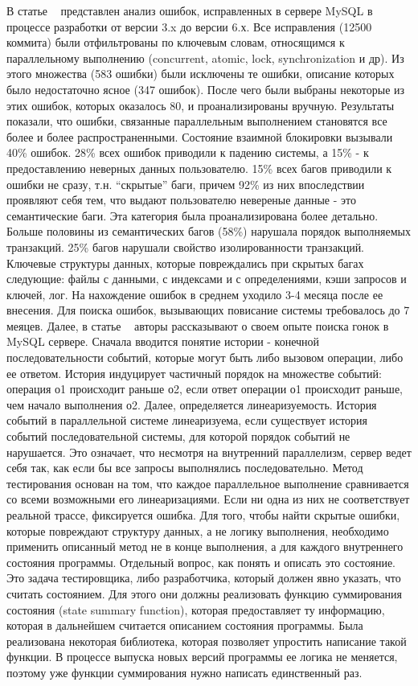 В статье ~\cite{Fonseca:2010} представлен анализ ошибок, исправленных в сервере MySQL в процессе разработки от версии 3.x до версии 6.х. Все исправления (12500 коммита) были отфильтрованы по ключевым словам, относящимся к параллельному выполнению (concurrent, atomic, lock, synchronization и др). Из этого множества (583 ошибки) были исключены те ошибки, описание которых было недостаточно ясное (347 ошибок). После чего были выбраны некоторые из этих ошибок, которых оказалось 80, и проанализированы вручную.  
Результаты показали, что ошибки, связанные параллельным выполнением становятся все более и более распространенными. Состояние взаимной блокировки вызывали 40\% ошибок. 28\% всех ошибок приводили к падению системы, а 15\% - к предоставлению неверных данных пользователю. 15\% всех багов приводили к ошибки не сразу, т.н. “скрытые” баги, причем 92\% из них впоследствии проявляют себя тем, что выдают пользователю невереные данные - это семантические баги. Эта категория была проанализирована более детально. Больше половины из семантических багов (58\%) нарушала порядок выполняемых транзакций. 25\% багов нарушали свойство изолированности транзакций. Ключевые структуры данных, которые повреждались при скрытых багах следующие: файлы с данными, с индексами и с определениями, кэши запросов и ключей, лог. 
На нахождение ошибок в среднем уходило 3-4 месяца после ее внесения. Для поиска ошибок, вызывающих повисание системы требовалось до 7 меяцев.
Далее, в статье ~\cite{Fonseca:2011} авторы рассказывают о своем опыте поиска гонок в MySQL сервере.
Сначала вводится понятие истории - конечной последовательности событий, которые могут быть либо вызовом операции, либо ее ответом. История индуцирует частичный порядок на множестве событий: операция о1 происходит раньше о2, если ответ операции о1 происходит раньше, чем начало выполнения о2. Далее, определяется линеаризуемость. История событий в параллельной системе линеаризуема, если существует история событий последовательной системы, для которой порядок событий не нарушается. Это означает, что несмотря на внутренний параллелизм, сервер ведет себя так, как если бы все запросы выполнялись последовательно. 
Метод тестирования основан на том, что каждое параллельное выполнение сравнивается со всеми возможными его линеаризациями. Если ни одна из них не соответствует реальной трассе, фиксируется ошибка. 
Для того, чтобы найти скрытые ошибки, которые повреждают структуру данных, а не логику выполнения, необходимо применить описанный метод не в конце выполнения, а для каждого внутреннего состояния программы. Отдельный вопрос, как понять и описать это состояние. Это задача тестировщика, либо разработчика, который должен явно указать, что считать состоянием. Для этого они должны реализовать функцию суммирования состояния (state summary function), которая предоставляет ту информацию, которая в дальнейшем считается описанием состояния программы. Была реализована некоторая библиотека, которая позволяет упростить написание такой функции. В процессе выпуска новых версий программы ее логика не меняется, поэтому уже функции суммирования нужно написать единственный раз.
